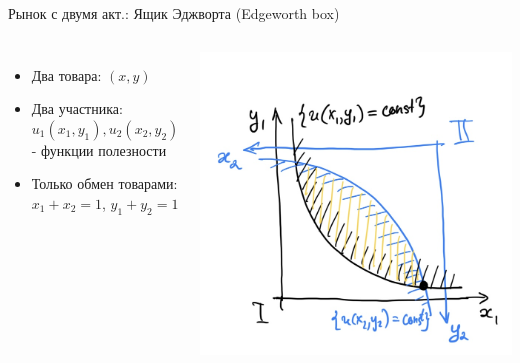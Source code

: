\documentclass{beamer}
\begin{document}
\begin{frame}{Рынок с двумя акт.: Ящик Эджворта (Edgeworth box)}

\begin{columns}
\begin{itemize}
    \item Два товара: $(x,y)$
    \item Два участника: $u_1(x_1,y_1), u_2(x_2,y_2)$ - функции полезности 
    \item Только обмен товарами: $x_1 + x_2 = 1$,  $y_1 + y_2 = 1$
\end{itemize}


        \includegraphics[width=1.0\textwidth]{2_figs/edgeworth.jpeg}


\end{columns}

\end{frame}
\end{document}
